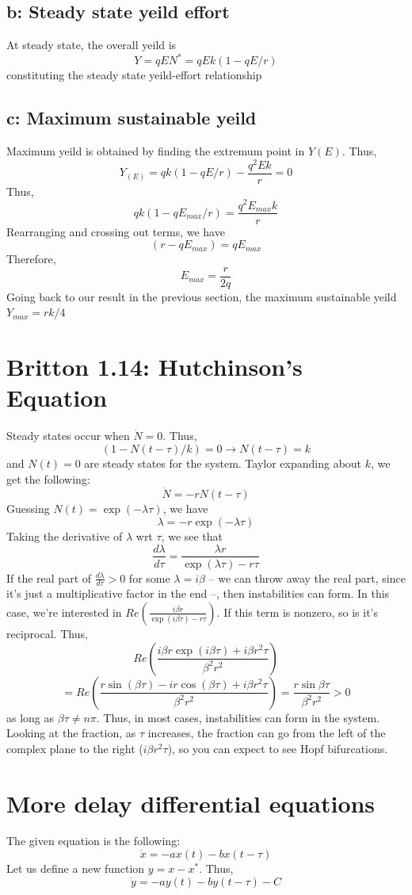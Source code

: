 \documentclass[english]{article}
\begin{document}
\subsection*{b: Steady state yeild effort}
At steady state, the overall yeild is 
$$ Y = qEN^{*} = qEk(1-qE/r) $$
constituting the steady state yeild-effort relationship
\subsection*{c: Maximum sustainable yeild}
Maximum yeild is obtained by finding the extremum point in $Y(E)$. Thus,
$$ Y_{(E)} = qk(1-qE/r) -\frac{q^{2}Ek}{r} = 0$$
Thus,
$$ qk(1-qE_{max}/r) = \frac{q^{2}E_{max}k}{r} $$
Rearranging and crossing out terms, we have
$$ (r-qE_{max}) = qE_{max}$$
Therefore,
$$ E_{max} = \frac{r}{2q} $$
Going back to our result in the previous section, the maximum sustainable yeild
$Y_{max} = rk/4$

\section{Britton 1.14: Hutchinson's Equation}
Steady states occur when $\dot{N}=0$. Thus,
$$ (1-N(t-\tau)/k) =0 \rightarrow N(t-\tau) = k $$
and $N(t) = 0$ are steady states for the system. Taylor expanding about $k$,
we get the following:
$$ \dot{N} = -rN(t-\tau) $$
Guessing $N(t) = \exp(-\lambda \tau)$, we have
$$ \lambda = -r\exp{(-\lambda \tau)}$$
Taking the derivative of $\lambda$ wrt $\tau$, we see that
$$ \frac{d\lambda}{d\tau} = \frac{\lambda r}{\exp{(\lambda \tau)}-r\tau}$$
If the real part of $\frac{d\lambda}{d\tau}>0$ for some $\lambda = i\beta$ 
-- we can throw away the real part, since it's just a multiplicative factor
in the end --, then instabilities can form. In this case, we're interested in
$ Re(\frac{i\beta r}{\exp(i\beta\tau)-r\tau}) $. If this term is nonzero, so is it's
reciprocal. Thus,
$$ Re\left(\frac{i\beta r\exp(i\beta\tau)+i\beta r^{2}\tau}{\beta^{2}r^{2}}\right)$$
$$ = Re\left(\frac{r\sin(\beta\tau)-ir\cos(\beta\tau)+i\beta r^{2}\tau}{\beta^{2}r^{2}}\right) 
= \frac{r\sin{\beta\tau}}{\beta^{2}r^{2}} > 0$$
as long as $\beta\tau \neq n\pi$. Thus, in most cases, instabilities can form 
in the system. Looking at the fraction, as $\tau$ increases, the fraction can go
from the left of the complex plane to the right ($i\beta r^{2}\tau$), so you can
expect to see Hopf bifurcations.

\section{More delay differential equations}
The given equation is the following:
$$ \dot{x} = -ax(t)-bx(t-\tau) $$
Let us define a new function $y = x-x^{*}$. Thus,
$$ \dot{y} = -ay(t)-by(t-\tau)-C$$
\end{document}
